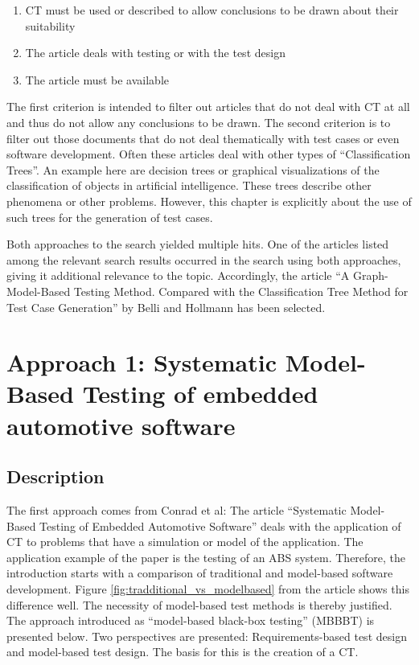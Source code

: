 \begin{enumerate}
\item CT must be used or described to allow conclusions to be drawn about their suitability
\item The article deals with testing or with the test design
\item The article must be available
\end{enumerate}

The first criterion is intended to filter out articles that do not deal with CT at all and thus do not allow any conclusions to be drawn. The second criterion is to filter out those documents that do not deal thematically with test cases or even software development. Often these articles deal with other types of \enquote{Classification Trees}. An example here are decision trees or graphical visualizations of the classification of objects in artificial intelligence. These trees describe other phenomena or  other problems. However, this chapter is explicitly about the use of such trees for the generation of test cases.

Both approaches to the search yielded multiple hits. One of the articles listed among the relevant search results occurred in the search using both approaches, giving it additional relevance to the topic. Accordingly, the article \enquote{A Graph-Model-Based Testing Method. Compared with the Classification Tree Method for Test Case Generation} by Belli and Hollmann\cite{Belli} has been selected.

\pagebreak

\section{Approach 1: Systematic Model-Based Testing of embedded automotive software}
\label{Kap:Approach1}

\subsection{Description}

The first approach comes from Conrad et al\cite{Conrad}: The article \enquote{Systematic Model-Based Testing of Embedded Automotive Software} deals with the application of CT to problems that have a simulation or model of the application. The application example of the paper is the testing of an ABS system. Therefore, the introduction starts with a comparison of traditional and model-based software development. Figure \autoref{fig:tradditional_vs_modelbased} from the article shows this difference well. The necessity of model-based test methods is thereby justified. The approach introduced as \enquote{model-based black-box testing} (MBBBT) is presented below. Two perspectives are presented: Requirements-based test design and model-based test design. The basis for this is the creation of a CT.

